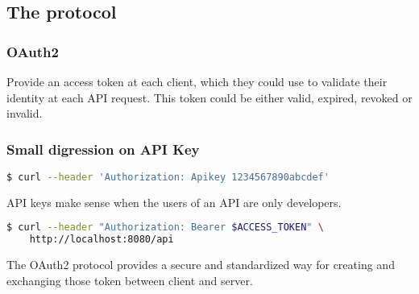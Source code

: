 \subsection{The protocol}
\subsubsection{OAuth2}
Provide an access token at each client, which they could use to validate their
identity at each API request.
This token could be either valid, expired, revoked or invalid.

\subsubsection{Small digression on API Key}
\begin{lstlisting}[language=bash]
$ curl --header 'Authorization: Apikey 1234567890abcdef'
\end{lstlisting}
API keys make sense when the users of an API are only developers.


\begin{lstlisting}[language=bash]
$ curl --header "Authorization: Bearer $ACCESS_TOKEN" \
    http://localhost:8080/api
\end{lstlisting}

The OAuth2 protocol provides a secure and standardized way for creating and exchanging those token between client and server.



